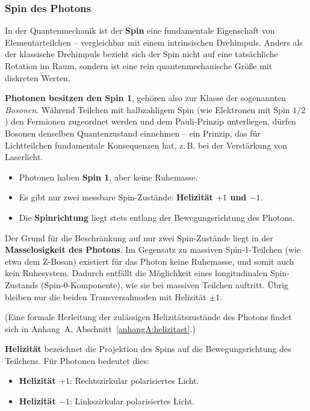 \subsubsection{Spin des Photons}

In der Quantenmechanik ist der \textbf{Spin} eine fundamentale Eigenschaft von Elementarteilchen – vergleichbar mit einem intrinsischen Drehimpuls. Anders als der klassische Drehimpuls bezieht sich der Spin nicht auf eine tatsächliche Rotation im Raum, sondern ist eine rein quantenmechanische Größe mit diskreten Werten.

\vspace{0.5em}
\textbf{Photonen besitzen den Spin 1}, gehören also zur Klasse der sogenannten \textit{Bosonen}. Während Teilchen mit halbzahligem Spin (wie Elektronen mit Spin $1/2$) den Fermionen zugeordnet werden und dem Pauli-Prinzip unterliegen, dürfen Bosonen denselben Quantenzustand einnehmen – ein Prinzip, das für Lichtteilchen fundamentale Konsequenzen hat, z.\,B. bei der Verstärkung von Laserlicht.
\vspace{1em}
\begin{tcolorbox}[physikbox, title=Eigenschaften des Photon-Spins]
	\label{box:Eigenschaften des}
	\begin{itemize}
		\item Photonen haben \textbf{Spin 1}, aber keine Ruhemasse.
		\item Es gibt nur zwei messbare Spin-Zustände: \textbf{Helizität $+1$ und $-1$}.
		\item Die \textbf{Spinrichtung} liegt stets entlang der Bewegungsrichtung des Photons.
	\end{itemize}
\end{tcolorbox}
\vspace{1em}
Der Grund für die Beschränkung auf nur zwei Spin-Zustände liegt in der \textbf{Masselosigkeit des Photons}. Im Gegensatz zu massiven Spin-1-Teilchen (wie etwa dem Z-Boson) existiert für das Photon keine Ruhemasse, und somit auch kein Ruhesystem. Dadurch entfällt die Möglichkeit eines longitudinalen Spin-Zustands (Spin-0-Komponente), wie sie bei massiven Teilchen auftritt. Übrig bleiben nur die beiden Transversalmoden mit Helizität $\pm1$.

(Eine formale Herleitung der zulässigen Helizitätszustände des Photons findet sich in Anhang~A, Abschnitt~\ref{anhangA:helizitaet}.)

\newpage
\noindent
\textbf{Helizität} bezeichnet die Projektion des Spins auf die Bewegungsrichtung des Teilchens. Für Photonen bedeutet dies:
\begin{itemize}
	\item \textbf{Helizität $+1$}: Rechtszirkular polarisiertes Licht.
	\item \textbf{Helizität $-1$}: Linkszirkular polarisiertes Licht.
\end{itemize}

